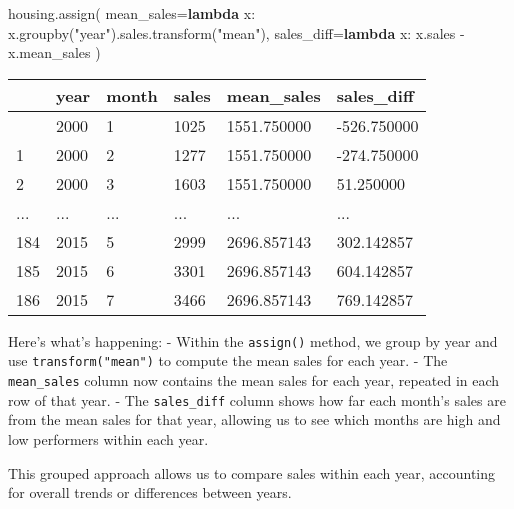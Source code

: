 \documentclass[
  letterpaper,
  DIV=11,
  numbers=noendperiod]{scrreprt}
\newenvironment{Shaded}{\begin{snugshade}}{\end{snugshade}}
\newcommand{\KeywordTok}[1]{\textcolor[rgb]{0.00,0.23,0.31}{\textbf{#1}}}
\newcommand{\NormalTok}[1]{\textcolor[rgb]{0.00,0.23,0.31}{#1}}
\newcommand{\OperatorTok}[1]{\textcolor[rgb]{0.37,0.37,0.37}{#1}}
\newcommand{\StringTok}[1]{\textcolor[rgb]{0.13,0.47,0.30}{#1}}
\begin{document}
\begin{Shaded}
\begin{Highlighting}[]
\NormalTok{housing.assign(}
\NormalTok{    mean\_sales}\OperatorTok{=}\KeywordTok{lambda}\NormalTok{ x: x.groupby(}\StringTok{"year"}\NormalTok{).sales.transform(}\StringTok{"mean"}\NormalTok{),}
\NormalTok{    sales\_diff}\OperatorTok{=}\KeywordTok{lambda}\NormalTok{ x: x.sales }\OperatorTok{{-}}\NormalTok{ x.mean\_sales}
\NormalTok{)}
\end{Highlighting}
\end{Shaded}

\begin{longtable}[]{@{}llllll@{}}
\toprule\noalign{}
& year & month & sales & mean\_sales & sales\_diff \\
\midrule\noalign{}
\endhead
\bottomrule\noalign{}
\endlastfoot
0 & 2000 & 1 & 1025 & 1551.750000 & -526.750000 \\
1 & 2000 & 2 & 1277 & 1551.750000 & -274.750000 \\
2 & 2000 & 3 & 1603 & 1551.750000 & 51.250000 \\
... & ... & ... & ... & ... & ... \\
184 & 2015 & 5 & 2999 & 2696.857143 & 302.142857 \\
185 & 2015 & 6 & 3301 & 2696.857143 & 604.142857 \\
186 & 2015 & 7 & 3466 & 2696.857143 & 769.142857 \\
\end{longtable}

Here's what's happening: - Within the \texttt{assign()} method, we group
by year and use \texttt{transform("mean")} to compute the mean sales for
each year. - The \texttt{mean\_sales} column now contains the mean sales
for each year, repeated in each row of that year. - The
\texttt{sales\_diff} column shows how far each month's sales are from
the mean sales for that year, allowing us to see which months are high
and low performers within each year.

This grouped approach allows us to compare sales within each year,
accounting for overall trends or differences between years.
\end{document}
